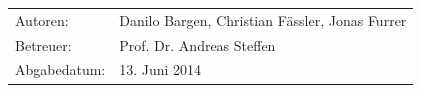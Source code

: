\begin{titlepage}
 \vspace{100pt}
 
 \begin{minipage}{0.4\textwidth}
 \begin{flushleft} \large
 \begin{tabular}{ll}
  
 Autoren: & Danilo Bargen, Christian Fässler, Jonas Furrer \\ 
 Betreuer: & Prof. Dr. Andreas Steffen\\ 
 Abgabedatum: & 13. Juni 2014\\
 
 \end{tabular}
 \end{flushleft}
 \end{minipage}

 
 \end{titlepage}

\tableofcontents\newpage
